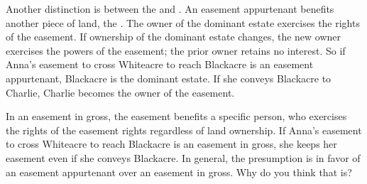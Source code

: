 Another distinction is between the  and
. An easement appurtenant benefits another piece of
land, the . The owner of the dominant estate exercises
the rights of the easement. If ownership of the dominant estate changes, the new
owner exercises the powers of the easement; the prior owner retains no interest.
So if Anna's easement to cross Whiteacre to reach Blackacre is an easement
appurtenant, Blackacre is the dominant estate. If she conveys Blackacre to
Charlie, Charlie becomes the owner of the easement. 

In an easement in gross, the easement benefits a specific person, who exercises
the rights of the easement rights regardless of land ownership. If Anna's
easement to cross Whiteacre to reach Blackacre is an easement in gross, she
keeps her easement even if she conveys Blackacre. In general, the presumption is
in favor of an easement appurtenant over an easement in gross. Why do you think
that is?

